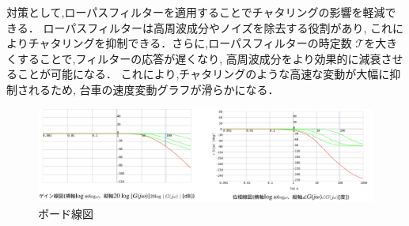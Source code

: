 対策として,ローパスフィルターを適用することでチャタリングの影響を軽減できる．
ローパスフィルターは高周波成分やノイズを除去する役割があり,
これによりチャタリングを抑制できる．さらに,ローパスフィルターの時定数 
\(\mathcal{T}\)を大きくすることで,フィルターの応答が遅くなり,
高周波成分をより効果的に減衰させることが可能になる．
これにより,チャタリングのような高速な変動が大幅に抑制されるため,
台車の速度変動グラフが滑らかになる．

\begin{figure}[h]
  \centering
  \includegraphics[scale=0.65]{sozai/4.pdf}
  \caption{ボード線図}
\end{figure}
